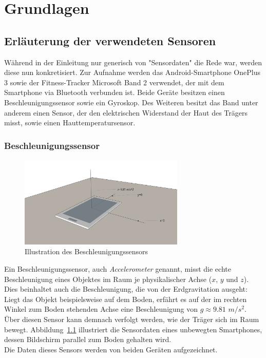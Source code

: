 \chapter{Grundlagen}
\label{chap:background}
\section{Erläuterung der verwendeten Sensoren}
Während in der Einleitung nur generisch von "Sensordaten" die Rede war, werden diese nun konkretisiert. Zur Aufnahme werden das Android-Smartphone OnePlus 3 sowie der Fitness-Tracker Microsoft Band 2 verwendet, der mit dem Smartphone via Bluetooth verbunden ist. Beide Geräte besitzen einen Beschleunigungssensor sowie ein Gyroskop. Des Weiteren besitzt das Band unter anderem einen Sensor, der den elektrischen Widerstand der Haut des Trägers misst, sowie einen Hauttemperatursensor.

\subsection{Beschleunigungssensor}
\begin{figure}
\centering
\includegraphics[clip=true,trim=0mm 100mm 100mm 30mm, width=0.7\textwidth]{img/accelerometer}
\caption{Illustration des Beschleunigungssensors}
\label{fig:accelerometer}
\end{figure}
Ein Beschleunigungssensor, auch \textit{Accelerometer} genannt, misst die echte Beschleunigung eines Objektes im Raum je physikalischer Achse ($x$, $y$ und $z$). Dies beinhaltet auch die Beschleunigung, die von der Erdgravitation ausgeht: Liegt das Objekt beispielsweise auf dem Boden, erfährt es auf der im rechten Winkel zum Boden stehenden Achse eine Beschleunigung von $g \approx 9.81$ $m/s^2$\cite{SensorsOverview, nistsi}. Über diesen Sensor kann demnach verfolgt werden, wie der Träger sich im Raum bewegt. Abbildung~\ref{fig:accelerometer} illustriert die Sensordaten eines unbewegten Smartphones, dessen Bildschirm parallel zum Boden gehalten wird. \\
Die Daten dieses Sensors werden von beiden Geräten aufgezeichnet.

